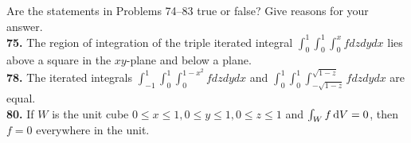 \documentclass[a4paper,12pt]{article}
\begin{document}
Are the statements in Problems 74–83 true or false? Give reasons for your answer. \\

\textbf{75.} The region of integration of the triple iterated integral
$\int_0^1 \int_0^1 \int_0^x f dz dy dx $ lies above a square in the $xy$-plane
and below a plane. \\

\textbf{78.} The iterated integrals $\int_{-1}^1 \int_0^1 \int_0^{1-x^2} f dz dy dx $
and $\int_0^1 \int_0^1 \int_{-\sqrt{1-z}}^{\sqrt{1-z}} f dz dy dx $ are equal. \\


\textbf{80.} If $W$ is the unit cube $0 \leq x \leq 1, 0 \leq y \leq 1, 0 \leq z \leq 1$
and $ \int _W f \, \text dV = 0$, then $f = 0$ everywhere in the unit. \\
\end{document}
